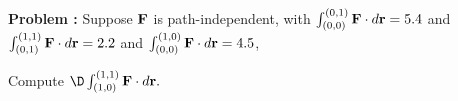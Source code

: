 
{\bf Problem :} Suppose \({\bf F}\) is path-independent, with
\(\int_{(0,0)}^{(0,1)}{\bf F} \cdot d{\bf r} = 5.4\) and
\(\int_{(0,1)}^{(1,1)}{\bf F} \cdot d{\bf r} = 2.2\) and
\(\int_{(0,0)}^{(1,0)}{\bf F} \cdot d{\bf r} = 4.5\),

\vspace{0.2cm}

Compute $\D \int_{(1,0)}^{(1,1)}{\bf F} \cdot d{\bf r}.$